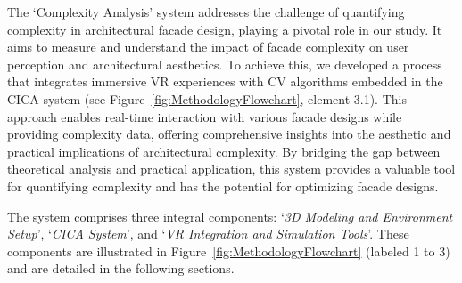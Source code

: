
The `Complexity Analysis' system addresses the challenge of quantifying complexity in architectural facade design, playing a pivotal role in our study.
It aims to measure and understand the impact of facade complexity on user perception and architectural aesthetics.
To achieve this, we developed a process that integrates immersive VR experiences with CV algorithms embedded in the CICA system (see Figure~\ref{fig:MethodologyFlowchart}, element 3.1).
This approach enables real-time interaction with various facade designs while providing complexity data, offering comprehensive insights into the aesthetic and practical implications of architectural complexity.
By bridging the gap between theoretical analysis and practical application, this system provides a valuable tool for quantifying complexity and has the potential for optimizing facade designs.

The system comprises three integral components: `\textit{3D Modeling and Environment Setup}', `\textit{CICA System}', and `\textit{VR Integration and Simulation Tools}'.
These components are illustrated in Figure~\ref{fig:MethodologyFlowchart} (labeled 1 to 3) and are detailed in the following sections.

%
%
